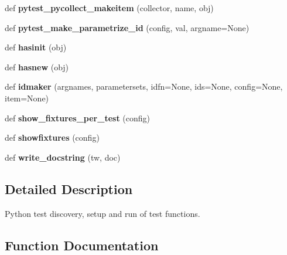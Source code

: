 \begin{DoxyCompactItemize}
\item 
\mbox{\label{namespace__pytest_1_1python_a6c3343065c3eebdbe433712d77c06f6c}} 
def {\bfseries pytest\+\_\+pycollect\+\_\+makeitem} (collector, name, obj)
\item 
\mbox{\label{namespace__pytest_1_1python_a95caff79069df975f6ea7e619705c3f1}} 
def {\bfseries pytest\+\_\+make\+\_\+parametrize\+\_\+id} (config, val, argname=None)
\item 
\mbox{\label{namespace__pytest_1_1python_a1e9223b8cc6db3530e77fadc93c19c24}} 
def {\bfseries hasinit} (obj)
\item 
\mbox{\label{namespace__pytest_1_1python_a45959412245631f6670c72ef15158fd2}} 
def {\bfseries hasnew} (obj)
\item 
\mbox{\label{namespace__pytest_1_1python_a31bcebf12f418eee1cfd4106b923639d}} 
def {\bfseries idmaker} (argnames, parametersets, idfn=None, ids=None, config=None, item=None)
\item 
\mbox{\label{namespace__pytest_1_1python_aee10c6bc577bfcb2ccf59d671ab38176}} 
def {\bfseries show\+\_\+fixtures\+\_\+per\+\_\+test} (config)
\item 
\mbox{\label{namespace__pytest_1_1python_aefe4b6850b87cd7d370629d7f11cfce4}} 
def {\bfseries showfixtures} (config)
\item 
\mbox{\label{namespace__pytest_1_1python_a607a07fc825e577e99b6f29e2dc41650}} 
def {\bfseries write\+\_\+docstring} (tw, doc)
\end{DoxyCompactItemize}


\subsection{Detailed Description}
\begin{DoxyVerb}Python test discovery, setup and run of test functions. \end{DoxyVerb}
 

\subsection{Function Documentation}
\mbox{\label{namespace__pytest_1_1python_a8834128df7c7408be62ca29220f7bbb3}} 
